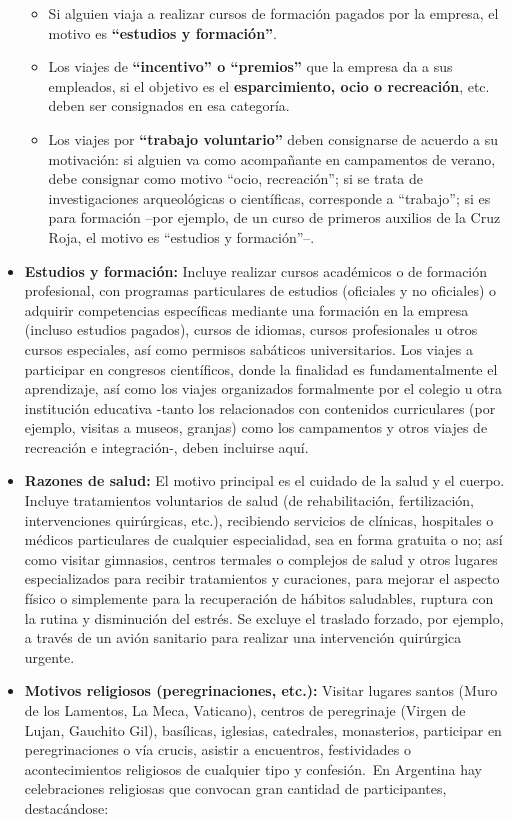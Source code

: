 \documentclass[
  openany]{book}
\begin{document}
\begin{itemize}
  \begin{itemize}
  \item
    Si alguien viaja a realizar cursos de formación pagados por la empresa, el motivo es \textbf{``estudios y formación''}.
  \item
    Los viajes de \textbf{``incentivo'' o ``premios''} que la empresa da a sus empleados, si el objetivo es el \textbf{esparcimiento, ocio o recreación}, etc. deben ser consignados en esa categoría.
  \item
    Los viajes por \textbf{``trabajo voluntario''} deben consignarse de acuerdo a su motivación: si alguien va como acompañante en campamentos de verano, debe consignar como motivo ``ocio, recreación''; si se trata de investigaciones arqueológicas o científicas, corresponde a ``trabajo''; si es para formación --por ejemplo, de un curso de primeros auxilios de la Cruz Roja, el motivo es ``estudios y formación''--.
  \end{itemize}
\item
  \textbf{Estudios y formación:} Incluye realizar cursos académicos o de formación profesional, con programas particulares de estudios (oficiales y no oficiales) o adquirir competencias específicas mediante una formación en la empresa (incluso estudios pagados), cursos de idiomas, cursos profesionales u otros cursos especiales, así como permisos sabáticos universitarios. Los viajes a participar en congresos científicos, donde la finalidad es fundamentalmente el aprendizaje, así como los viajes organizados formalmente por el colegio u otra institución educativa -tanto los relacionados con contenidos curriculares (por ejemplo, visitas a museos, granjas) como los campamentos y otros viajes de recreación e integración-, deben incluirse aquí.
\item
  \textbf{Razones de salud:} El motivo principal es el cuidado de la salud y el cuerpo. Incluye tratamientos voluntarios de salud (de rehabilitación, fertilización, intervenciones quirúrgicas, etc.), recibiendo servicios de clínicas, hospitales o médicos particulares de cualquier especialidad, sea en forma gratuita o no; así como visitar gimnasios, centros termales o complejos de salud y otros lugares especializados para recibir tratamientos y curaciones, para mejorar el aspecto físico o simplemente para la recuperación de hábitos saludables, ruptura con la rutina y disminución del estrés. Se excluye el traslado forzado, por ejemplo, a través de un avión sanitario para realizar una intervención quirúrgica urgente.
\item
  \textbf{Motivos religiosos (peregrinaciones, etc.):} Visitar lugares santos (Muro de los Lamentos, La Meca, Vaticano), centros de peregrinaje (Virgen de Lujan, Gauchito Gil), basílicas, iglesias, catedrales, monasterios, participar en peregrinaciones o vía crucis, asistir a encuentros, festividades o acontecimientos religiosos de cualquier tipo y confesión.~En Argentina hay celebraciones religiosas que convocan gran cantidad de participantes, destacándose:


\end{itemize}
\end{document}
